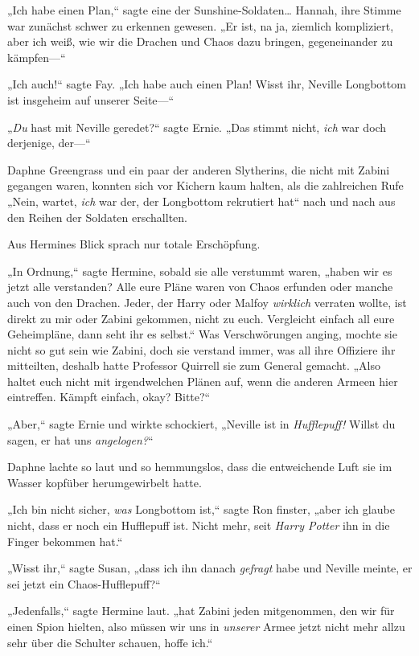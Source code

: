 {„Ich habe einen Plan,“ sagte eine der Sunshine-Soldaten… Hannah, ihre Stimme war zunächst schwer zu erkennen gewesen. „Er ist, na ja, ziemlich kompliziert, aber ich weiß, wie wir die Drachen und Chaos dazu bringen, gegeneinander zu kämpfen—“

„Ich auch!“ sagte Fay. „Ich habe auch einen Plan! Wisst ihr, Neville Longbottom ist insgeheim auf unserer Seite—“

„\emph{Du} hast mit Neville geredet?“ sagte Ernie. „Das stimmt nicht, \emph{ich} war doch derjenige, der—“

Daphne Greengrass und ein paar der anderen Slytherins, die nicht mit Zabini gegangen waren, konnten sich vor Kichern kaum halten, als die zahlreichen Rufe „Nein, wartet, \emph{ich} war der, der Longbottom rekrutiert hat“ nach und nach aus den Reihen der Soldaten erschallten.

Aus Hermines Blick sprach nur totale Erschöpfung.

„In Ordnung,“ sagte Hermine, sobald sie alle verstummt waren, „haben wir es jetzt alle verstanden? Alle eure Pläne waren von Chaos erfunden oder manche auch von den Drachen. Jeder, der Harry oder Malfoy \emph{wirklich} verraten wollte, ist direkt zu mir oder Zabini gekommen, nicht zu euch. Vergleicht einfach all eure Geheimpläne, dann seht ihr es selbst.“ Was Verschwörungen anging, mochte sie nicht so gut sein wie Zabini, doch sie verstand immer, was all ihre Offiziere ihr mitteilten, deshalb hatte Professor Quirrell sie zum General gemacht. „Also haltet euch nicht mit irgendwelchen Plänen auf, wenn die anderen Armeen hier eintreffen. Kämpft einfach, okay? Bitte?“

„Aber,“ sagte Ernie und wirkte schockiert, „Neville ist in \emph{Hufflepuff!} Willst du sagen, er hat uns \emph{angelogen?}“

Daphne lachte so laut und so hemmungslos, dass die entweichende Luft sie im Wasser kopfüber herumgewirbelt hatte.

„Ich bin nicht sicher, \emph{was} Longbottom ist,“ sagte Ron finster, „aber ich glaube nicht, dass er noch ein Hufflepuff ist. Nicht mehr, seit \emph{Harry Potter} ihn in die Finger bekommen hat.“

„Wisst ihr,“ sagte Susan, „dass ich ihn danach \emph{gefragt} habe und Neville meinte, er sei jetzt ein Chaos-Hufflepuff?“

„Jedenfalls,“ sagte Hermine laut. „hat Zabini jeden mitgenommen, den wir für einen Spion hielten, also müssen wir uns in \emph{unserer} Armee jetzt nicht mehr allzu sehr über die Schulter schauen, hoffe ich.“

}
